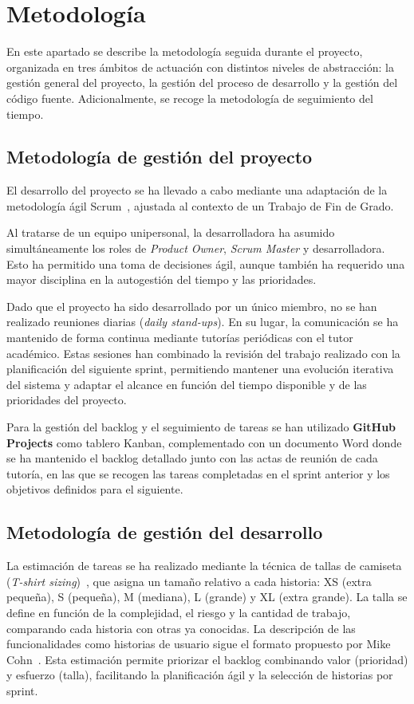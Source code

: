 \section{Metodología}

En este apartado se describe la metodología seguida durante el proyecto, organizada en tres ámbitos de actuación con distintos niveles de abstracción: la gestión general del proyecto, la gestión del proceso de desarrollo y la gestión del código fuente. Adicionalmente, se recoge la metodología de seguimiento del tiempo.

\subsection{Metodología de gestión del proyecto}

El desarrollo del proyecto se ha llevado a cabo mediante una adaptación de la metodología ágil Scrum~\cite{scrumguide2020}, ajustada al contexto de un Trabajo de Fin de Grado.

Al tratarse de un equipo unipersonal, la desarrolladora ha asumido simultáneamente los roles de \textit{Product Owner}, \textit{Scrum Master} y desarrolladora. Esto ha permitido una toma de decisiones ágil, aunque también ha requerido una mayor disciplina en la autogestión del tiempo y las prioridades.

Dado que el proyecto ha sido desarrollado por un único miembro, no se han realizado reuniones diarias (\textit{daily stand-ups}). En su lugar, la comunicación se ha mantenido de forma continua mediante tutorías periódicas con el tutor académico. Estas sesiones han combinado la revisión del trabajo realizado con la planificación del siguiente sprint, permitiendo mantener una evolución iterativa del sistema y adaptar el alcance en función del tiempo disponible y de las prioridades del proyecto.

Para la gestión del backlog y el seguimiento de tareas se han utilizado \textbf{GitHub Projects} como tablero Kanban, complementado con un documento Word donde se ha mantenido el backlog detallado junto con las actas de reunión de cada tutoría, en las que se recogen las tareas completadas en el sprint anterior y los objetivos definidos para el siguiente.

\subsection{Metodología de gestión del desarrollo}

La estimación de tareas se ha realizado mediante la técnica de tallas de camiseta (\textit{T-shirt sizing})~\cite{cohn2005estimating}, que asigna un tamaño relativo a cada historia: XS (extra pequeña), S (pequeña), M (mediana), L (grande) y XL (extra grande). La talla se define en función de la complejidad, el riesgo y la cantidad de trabajo, comparando cada historia con otras ya conocidas. La descripción de las funcionalidades como historias de usuario sigue el formato propuesto por Mike Cohn~\cite{cohn2004userstories}. Esta estimación permite priorizar el backlog combinando valor (prioridad) y esfuerzo (talla), facilitando la planificación ágil y la selección de historias por sprint.

